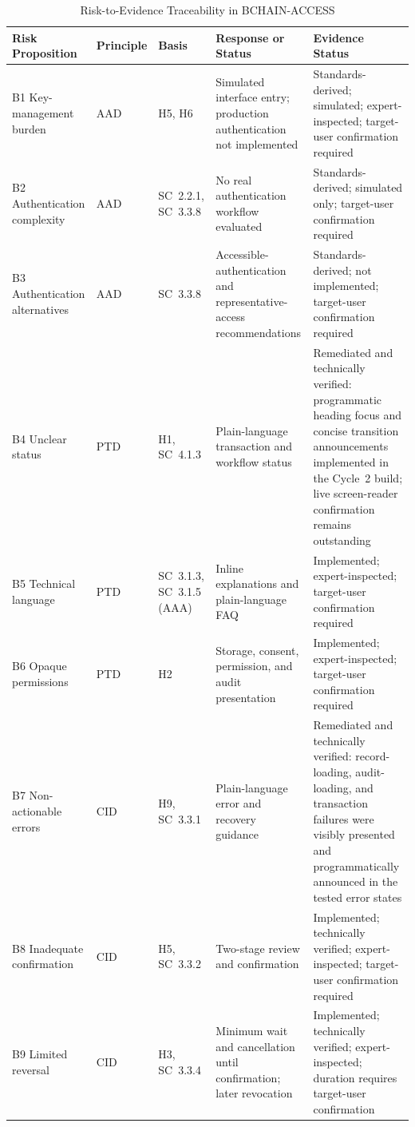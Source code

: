 \documentclass[journal]{IEEEtran}
\renewcommand{\arraystretch}{1.08}
\begin{document}
\begin{table}[!t]
\caption{Risk-to-Evidence Traceability in BCHAIN-ACCESS}
\label{tab:traceability}
\centering
\footnotesize
\setlength{\tabcolsep}{3pt}
\renewcommand{\arraystretch}{1.08}
\begin{tabularx}{\textwidth}{p{}p{}p{}X p{}}
\toprule
\textbf{Risk Proposition} & \textbf{Principle} & \textbf{Basis} & \textbf{Response or Status} & \textbf{Evidence Status} \\
\midrule
B1 Key-management burden & AAD & H5, H6 & Simulated interface entry; production authentication not implemented & Standards-derived; simulated; expert-inspected; target-user confirmation required \\
B2 Authentication complexity & AAD & SC~2.2.1, SC~3.3.8 & No real authentication workflow evaluated & Standards-derived; simulated only; target-user confirmation required \\
B3 Authentication alternatives & AAD & SC~3.3.8 & Accessible-authentication and representative-access recommendations & Standards-derived; not implemented; target-user confirmation required \\
B4 Unclear status & PTD & H1, SC~4.1.3 & Plain-language transaction and workflow status & Remediated and technically verified: programmatic heading focus and concise transition announcements implemented in the Cycle~2 build; live screen-reader confirmation remains outstanding \\
B5 Technical language & PTD & SC~3.1.3, SC~3.1.5 (AAA) & Inline explanations and plain-language FAQ & Implemented; expert-inspected; target-user confirmation required \\
B6 Opaque permissions & PTD & H2 & Storage, consent, permission, and audit presentation & Implemented; expert-inspected; target-user confirmation required \\
B7 Non-actionable errors & CID & H9, SC~3.3.1 & Plain-language error and recovery guidance & Remediated and technically verified: record-loading, audit-loading, and transaction failures were visibly presented and programmatically announced in the tested error states \\
B8 Inadequate confirmation & CID & H5, SC~3.3.2 & Two-stage review and confirmation & Implemented; technically verified; expert-inspected; target-user confirmation required \\
B9 Limited reversal & CID & H3, SC~3.3.4 & Minimum wait and cancellation until confirmation; later revocation & Implemented; technically verified; expert-inspected; duration requires target-user confirmation \\

\end{tabularx}
\end{table}
\end{document}
